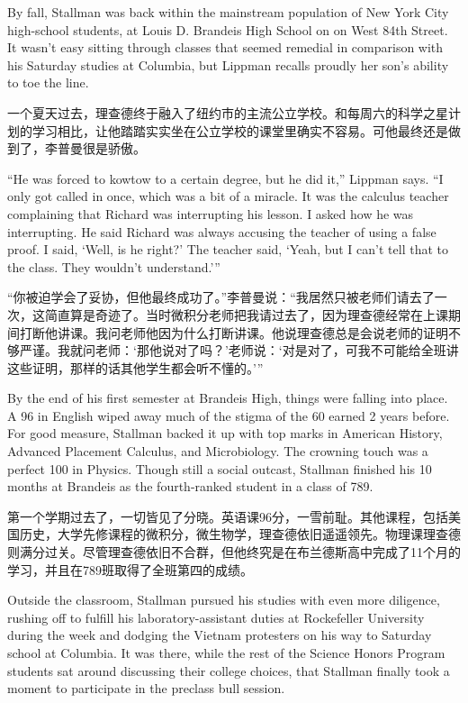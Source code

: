 \ifdefined\eng
By fall, Stallman was back within the mainstream population of New York City high-school students, at Louis D. Brandeis High School on on West 84th Street. It wasn't easy sitting through classes that seemed remedial in comparison with his Saturday studies at Columbia, but Lippman recalls proudly her son's ability to toe the line.
\fi

\ifdefined\chs
一个夏天过去，理查德终于融入了纽约市的主流公立学校。和每周六的科学之星计划的学习相比，让他踏踏实实坐在公立学校的课堂里确实不容易。可他最终还是做到了，李普曼很是骄傲。
\fi

\ifdefined\eng
``He was forced to kowtow to a certain degree, but he did it,'' Lippman says. ``I only got called in once, which was a bit of a miracle. It was the calculus teacher complaining that Richard was interrupting his lesson. I asked how he was interrupting. He said Richard was always accusing the teacher of using a false proof. I said, `Well, is he right?' The teacher said, `Yeah, but I can't tell that to the class. They wouldn't understand.'\hspace{0.01in}''
\fi

\ifdefined\chs
“你被迫学会了妥协，但他最终成功了。”李普曼说：“我居然只被老师们请去了一次，这简直算是奇迹了。当时微积分老师把我请过去了，因为理查德经常在上课期间打断他讲课。我问老师他因为什么打断讲课。他说理查德总是会说老师的证明不够严谨。我就问老师：‘那他说对了吗？’老师说：‘对是对了，可我不可能给全班讲这些证明，那样的话其他学生都会听不懂的。’”
\fi

\ifdefined\eng
By the end of his first semester at Brandeis High, things were falling into place. A 96 in English wiped away much of the stigma of the 60 earned 2 years before. For good measure, Stallman backed it up with top marks in American History, Advanced Placement Calculus, and Microbiology. The crowning touch was a perfect 100 in Physics. Though still a social outcast, Stallman finished his 10 months at Brandeis as the fourth-ranked student in a class of 789.
\fi

\ifdefined\chs
第一个学期过去了，一切皆见了分晓。英语课96分，一雪前耻。其他课程，包括美国历史，大学先修课程的微积分，微生物学，理查德依旧遥遥领先。物理课理查德则满分过关。尽管理查德依旧不合群，但他终究是在布兰德斯高中完成了11个月的学习，并且在789班取得了全班第四的成绩。
\fi

\ifdefined\eng
Outside the classroom, Stallman pursued his studies with even more diligence, rushing off to fulfill his laboratory-assistant duties at Rockefeller University during the week and dodging the Vietnam protesters on his way to Saturday school at Columbia. It was there, while the rest of the Science Honors Program students sat around discussing their college choices, that Stallman finally took a moment to participate in the preclass bull session.
\fi

